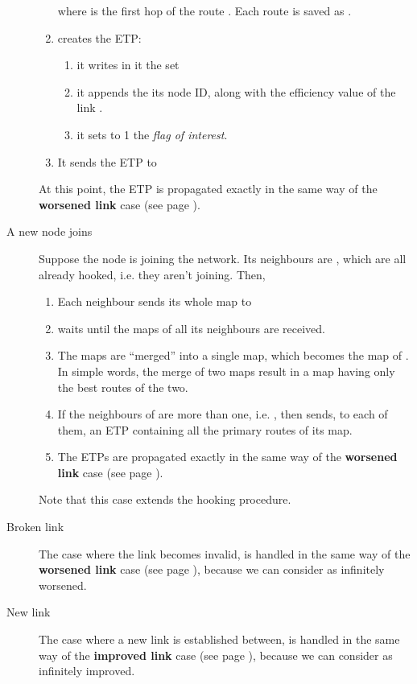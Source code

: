 \documentclass[a4paper]{article}
\begin{document}
\begin{description}
\begin{enumerate}
			      where  is the first hop of the route
			      . 
			      Each route  is saved as .
		      \item  creates the ETP:
			\begin{enumerate}
				\item it writes in it the set 
				\item it appends the its node ID, along with the efficiency
					value of the link .
				\item it sets to 1 the \emph{flag of interest}.
			\end{enumerate}
		      \item It sends the ETP to 
		\end{enumerate}
		At this point, the ETP is propagated exactly in the same way
		of the \textbf{worsened link} case (see page \pageref{wlink}).
	\item[A new node joins]
		Suppose the node  is joining the network. Its neighbours
		are , which are all already hooked, i.e.
		they aren't joining. Then,
		\begin{enumerate}
			\item Each neighbour  sends its whole map to
				
			\item  waits until the maps of all its neighbours
				are received.
			\item The maps are ``merged'' into a single map, which
				becomes the map of . In simple words, the
				merge of two maps result in a map having only the
				best routes of the two.
			\item If the neighbours of  are more than one, i.e.
				, then  sends, to each of them, an ETP
				containing all the primary routes of its map.
			\item The ETPs are propagated exactly in the same way
				of the \textbf{worsened link} case (see page
				\pageref{wlink}).
		\end{enumerate}
		Note that this case extends the hooking procedure.
	\item[Broken link] 
		The case where the link  becomes invalid, is handled
		in the same way of the \textbf{worsened link} case (see
		page \pageref{wlink}), because we can consider  as
		infinitely worsened.
	\item[New link]
		The case where a new link 
		is established between, is handled  in the same way of the
		\textbf{improved link} case (see page \pageref{ilink}),
		because we can consider  as infinitely improved.
\end{description}
\end{document}
